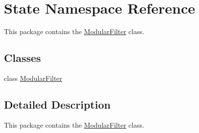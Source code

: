 \hypertarget{namespaceState}{}\section{State Namespace Reference}
\label{namespaceState}


This package contains the \hyperlink{classState_1_1ModularFilter}{Modular\+Filter} class.  


\subsection*{Classes}
\begin{DoxyCompactItemize}
\item 
class \hyperlink{classState_1_1ModularFilter}{Modular\+Filter}
\end{DoxyCompactItemize}


\subsection{Detailed Description}
This package contains the \hyperlink{classState_1_1ModularFilter}{Modular\+Filter} class. 

